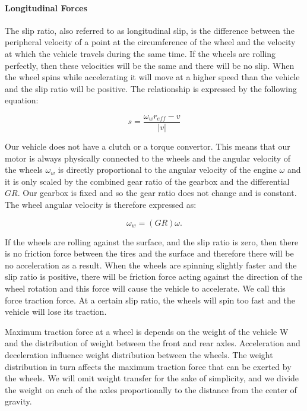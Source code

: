 \paragraph{Longitudinal Forces}

The slip ratio, also referred to as longitudinal slip, is the difference between the peripheral velocity of a point at the circumference of the wheel and the velocity at which the vehicle travels during the same time. If the wheels are rolling perfectly, then these velocities will be the same and there will be no slip. When the wheel spins while accelerating it will move at a higher speed than the vehicle and the slip ratio will be positive. The relationship is expressed by the following equation:

\begin{equation}
s=\dfrac{\omega_w r_{eff}-v}{|v|}
\end{equation}

Our vehicle does not have a clutch or a torque convertor. This means that our motor is always physically connected to the wheels and the angular velocity of the wheels $\omega_w$ is directly proportional to the angular velocity of the engine $\omega$ and it is only scaled by the combined gear ratio of the gearbox and the differential $GR$. Our gearbox is fixed and so the gear ratio does not change and is constant. The wheel angular velocity is therefore expressed as:

\begin{equation}
\omega_w = (GR) \omega.
\end{equation}

If the wheels are rolling against the surface, and the slip ratio is zero, then there is no friction force between the tires and the surface and therefore there will be no acceleration as a result. When the wheels are spinning slightly faster and the slip ratio is positive, there will be friction force acting against the direction of the wheel rotation and this force will cause the vehicle to accelerate. We call this force traction force. At a certain slip ratio, the wheels will spin too fast and the vehicle will lose its traction.

Maximum traction force at a wheel is depends on the weight of the vehicle W and the distribution of weight between the front and rear axles. Acceleration and deceleration influence weight distribution between the wheels. The weight distribution in turn affects the maximum traction force that can be exerted by the wheels. We will omit weight transfer for the sake of simplicity, and we divide the weight on each of the axles proportionally to the distance from the center of gravity.

